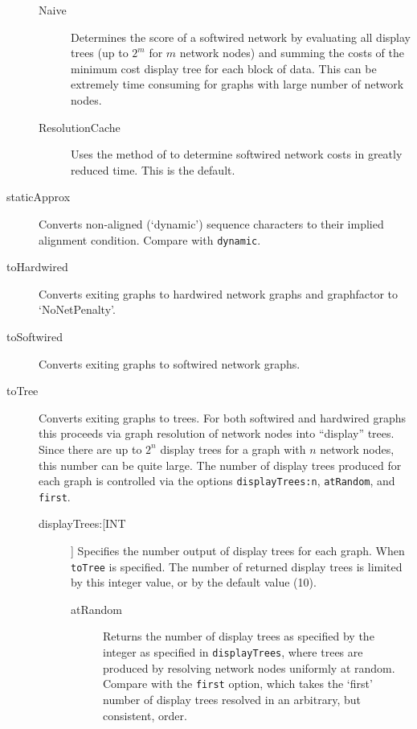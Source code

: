 \begin{description}
		\begin{description}
			
			\item[Naive] Determines the score of a softwired network by evaluating all 
			display trees (up to $2^m$ for $m$ network nodes) and summing the costs 
			of the minimum cost display tree for each block	of data. This can be extremely 
			time consuming for graphs with large number of network nodes.
					
			\item[ResolutionCache] Uses the method of \citep{WheelerandWashburn2023} 
			to determine softwired network costs in greatly reduced time. This is the default.
			
		\end{description}
			
		\item[staticApprox] Converts non-aligned (`dynamic') sequence characters to their 
		implied alignment \citep{Wheeler2003, WashburnandWheeler2020} condition.
		Compare with \texttt{dynamic}.
			
		\item[toHardwired] Converts exiting graphs to hardwired network graphs and graphfactor 
		to `NoNetPenalty'.
			
		\item[toSoftwired] Converts exiting graphs to softwired network graphs.
			
		\item[toTree] Converts exiting graphs to trees. For both softwired and hardwired graphs 
		this proceeds via graph resolution of network nodes into ``display'' trees. Since there are 
		up to $2^n$ display trees for a graph with $n$ network nodes, this number can be quite 
		large. The number of display trees produced for each graph is controlled via the options 
		\texttt{displayTrees:n}, \texttt{atRandom}, and \texttt{first}. 
		
					
		\begin{description}
			\item[displayTrees:[INT]] Specifies the number output of display trees for each graph. 
			When \texttt{toTree} is specified. The number of returned display trees is limited by 
			this integer value, or by the default value (10).
		
			\begin{description}
			
				\item[atRandom] Returns the number of display trees as specified by the integer 
				as specified in \texttt{displayTrees}, where trees are produced by resolving 
				network nodes uniformly at random. Compare with the \texttt{first} option, which 
				takes the `first' number of display trees resolved in an arbitrary, but consistent, 
				order.


\end{description}
\end{description}
\end{description}
